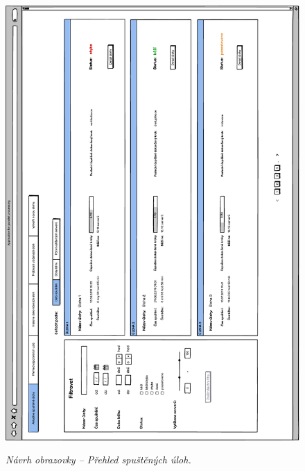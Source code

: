 \begin{figure}[H]
\begin{center}
    \scalebox{0.78}
    {   
        \includegraphics{images/wireframe_appendix_runTaskOverview.pdf}
    }
    \caption{\label{obr:wireframe_appendix_runTaskOverview} {\it Návrh obrazovky -- Přehled spuštěných úloh.}}
\end{center}
\end{figure}


